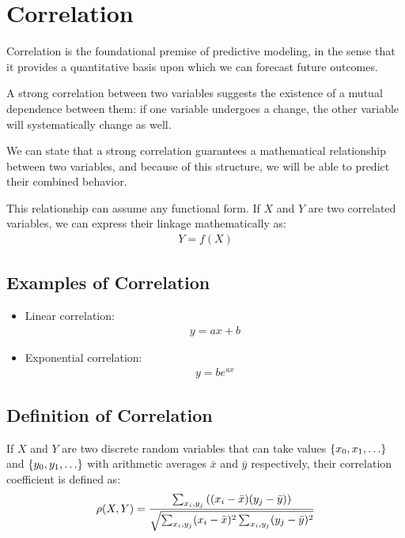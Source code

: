 \section{Correlation}

Correlation is the foundational premise of predictive modeling, in the sense that it provides a quantitative basis upon which we can forecast future outcomes.

A strong correlation between two variables suggests the existence of a mutual dependence between them: if one variable undergoes a change, the other variable will systematically change as well.

We can state that a strong correlation guarantees a mathematical relationship between two variables, and because of this structure, we will be able to predict their combined behavior.

This relationship can assume any functional form. If $X$ and $Y$ are two correlated variables, we can express their linkage mathematically as:
\begin{align}
	Y = f(X)
\end{align}

\subsection{Examples of Correlation}
\begin{itemize}
	\item Linear correlation:
	\begin{align}
		y = ax + b
	\end{align}
	\item Exponential correlation:
	\begin{align}
		y = be^{ax}
	\end{align}
\end{itemize}

\subsection{Definition of Correlation}
If $X$ and $Y$ are two discrete random variables that can take values $\set{x_0, x_1, \dots}$ and $\set{y_0, y_1, \dots}$ with arithmetic averages $\bar{x}$ and $\bar{y}$ respectively, their correlation coefficient is defined as:
\begin{align}
	\rho(X,Y) = \dfrac{\sum_{x_i, y_j} \left( (x_i - \bar{x})(y_j - \bar{y}) \right)}{\sqrt{\sum_{x_i, y_j} (x_i - \bar{x})^2 \sum_{x_i, y_j} (y_j - \bar{y})^2}}
\end{align}


